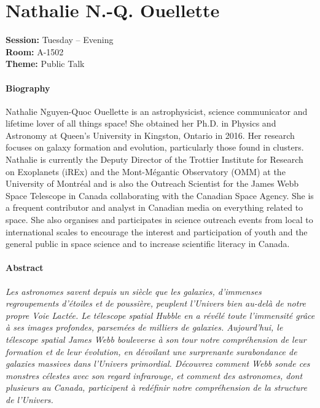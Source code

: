 \hypertarget{invited-nathalie-ouellette}{}
\label{invited-page-nathalie-ouellette}
\section{Nathalie N.-Q. Ouellette}
\textbf{Session:} Tuesday -- Evening\\
\textbf{Room:} A-1502\\
\textbf{Theme:} Public Talk\\

\paragraph{Biography}
{\sffamily
Nathalie Nguyen-Quoc Ouellette is an astrophysicist, science communicator and lifetime lover of all things space! She obtained her Ph.D. in Physics and Astronomy at Queen's University in Kingston, Ontario in 2016. Her research focuses on galaxy formation and evolution, particularly those found in clusters. Nathalie is currently the Deputy Director of the Trottier Institute for Research on Exoplanets (iREx) and the Mont-Mégantic Observatory (OMM) at the University of Montréal and is also the Outreach Scientist for the James Webb Space Telescope in Canada collaborating with the Canadian Space Agency. She is a frequent contributor and analyst in Canadian media on everything related to space. She also organises and participates in science outreach events from local to international scales to encourage the interest and participation of youth and the general public in space science and to increase scientific literacy in Canada.
}

\paragraph{Abstract}
{\itshape
Les astronomes savent depuis un siècle que les galaxies, d'immenses regroupements d'étoiles et de poussière, peuplent l'Univers bien au-delà de notre propre Voie Lactée. Le télescope spatial Hubble en a révélé toute l'immensité grâce à ses images profondes, parsemées de milliers de galaxies. Aujourd'hui, le télescope spatial James Webb bouleverse à son tour notre compréhension de leur formation et de leur évolution, en dévoilant une surprenante surabondance de galaxies massives dans l'Univers primordial. Découvrez comment Webb sonde ces monstres célestes avec son regard infrarouge, et comment des astronomes, dont plusieurs au Canada, participent à redéfinir notre compréhension de la structure de l'Univers.
}


